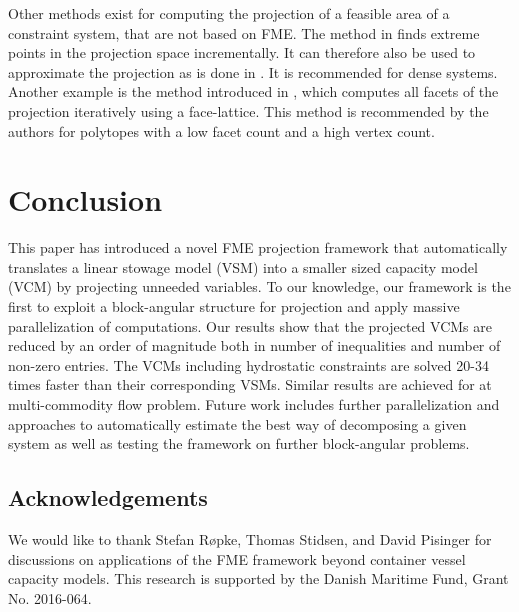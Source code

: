 \documentclass{llncs}
\begin{document}
Other methods exist for computing the projection of a feasible area of a constraint system, that are not based on FME. The method in \cite{huynh92} finds extreme points in the projection space incrementally. It can therefore also be used to approximate the projection as is done in \cite{simon05}. It is recommended for dense systems. Another example is the method introduced in \cite{jones04}, which computes all facets of the projection iteratively using a face-lattice. This method is recommended by the authors for polytopes with a low facet count and a high vertex count.

\section{Conclusion}\label{sec:conclusion}
This paper has introduced a novel FME projection framework that automatically translates a linear stowage model (VSM) into a smaller sized capacity model (VCM) by projecting unneeded variables. To our knowledge, our framework is the first to exploit a block-angular structure for projection and apply massive parallelization of computations. Our results show that the projected VCMs are reduced by an order of magnitude both in number of inequalities and number of non-zero entries. The VCMs including hydrostatic constraints are solved 20-34 times faster than their corresponding VSMs. Similar results are achieved for at multi-commodity flow problem. Future work includes further parallelization and approaches to automatically estimate the best way of decomposing a given system as well as testing the framework on further block-angular problems.

\subsection*{Acknowledgements}
We would like to thank Stefan R{\o}pke, Thomas Stidsen, and David Pisinger for discussions on applications of the FME framework beyond container vessel capacity models. This research is supported by the Danish Maritime Fund, Grant No. 2016-064.



\end{document}
